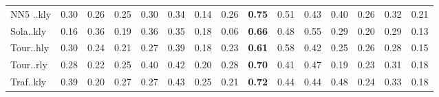 \begin{tabular}{l|ccccccccccc}
        NN5 ..kly & 0.30 & 0.26 & 0.25 & 0.30 & 0.34 & 0.14 & 0.26 & \textbf{0.75} & 0.51 & 0.43 & 0.40 & 0.26 & 0.32 & 0.21 \\
        Sola..kly & 0.16 & 0.36 & 0.19 & 0.36 & 0.35 & 0.18 & 0.06 & \textbf{0.66} & 0.48 & 0.55 & 0.29 & 0.20 & 0.29 & 0.13 \\
        Tour..hly & 0.30 & 0.24 & 0.21 & 0.27 & 0.39 & 0.18 & 0.23 & \textbf{0.61} & 0.58 & 0.42 & 0.25 & 0.26 & 0.28 & 0.15 \\
        Tour..rly & 0.28 & 0.22 & 0.25 & 0.40 & 0.42 & 0.20 & 0.28 & \textbf{0.70} & 0.41 & 0.47 & 0.19 & 0.23 & 0.31 & 0.18 \\
        Traf..kly & 0.39 & 0.20 & 0.27 & 0.27 & 0.43 & 0.25 & 0.21 & \textbf{0.72} & 0.44 & 0.44 & 0.48 & 0.24 & 0.33 & 0.18 \\
        \bottomrule
    \end{tabular}